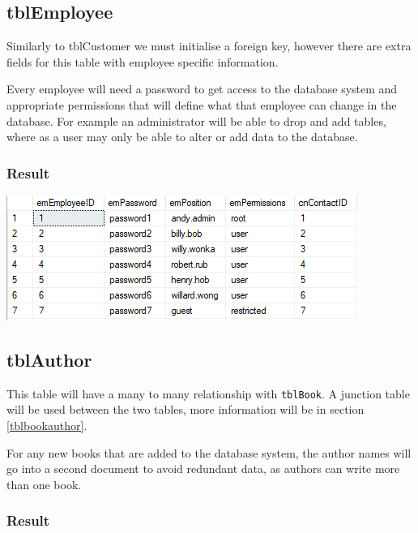 \documentclass[11pt,a4paper]{scrartcl}
\begin{document}
	\subsection{tblEmployee}\label{tblemployee}
	
	Similarly to tblCustomer we must initialise a foreign key, however there are extra fields for this table with employee specific information.
	
	
	
	Every employee will need a password to get access to the database system and appropriate permissions that will define what that employee can change in the database. For example an administrator will be able to drop and add tables, where as a user may only be able to alter or add data to the database.
	
	\subsubsection*{Result}
	
	\begin{center}
		\includegraphics[width=0.7\linewidth]{images/Employee}
	\end{center}
	
	\subsection{tblAuthor}\label{tblauthor}
	
	This table will have a many to many relationship with \texttt{tblBook}. A junction table will be used between the two tables, more information will be in section \ref{tblbookauthor}.
	
	
	
	For any new books that are added to the database system, the author names will go into a second document to avoid redundant data, as authors can write more than one book.
	
	\subsubsection*{Result}
	
\end{document}
